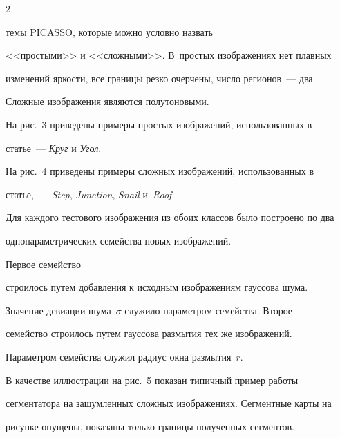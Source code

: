 \begin{multicols}{2}





\noindent 


те\-мы \mbox{PICASSO}, которые можно условно назвать


<<простыми>> и <<сложными>>. В~простых изображениях нет плавных 


изменений яркости, все границы резко очерчены, число регионов~--- два. 


Сложные изображения являются полутоновыми.


  


  На рис.~3 приведены примеры простых изображений, использованных в 


статье~--- \textit{Круг} и \textit{Угол}.


      


  На рис.~4 приведены примеры сложных изображений, использованных в 


статье,~--- \textit{Step}, \textit{Junction},  \textit{Snail}  и~\textit{Roof}.


   Для каждого тестового изображения из обоих классов было построено по два 


одно\-па\-ра\-мет\-ри\-че\-ских семейства новых изображений. 





Первое семейство 


строилось путем добавления к исходным изображениям гауссова шума. 


Значение девиации шума~$\sigma$ служило параметром семейства. Второе 


семейство строилось путем гауссова размытия тех же изображений. 


Параметром семейства служил радиус окна размытия~$r$.


  


  В качестве иллюстрации на рис.~5 показан типичный пример работы 


сегментатора на зашумленных сложных изображениях. Сегментные карты на 


рисунке опущены, показаны только границы полученных сегментов.












\end{multicols}
